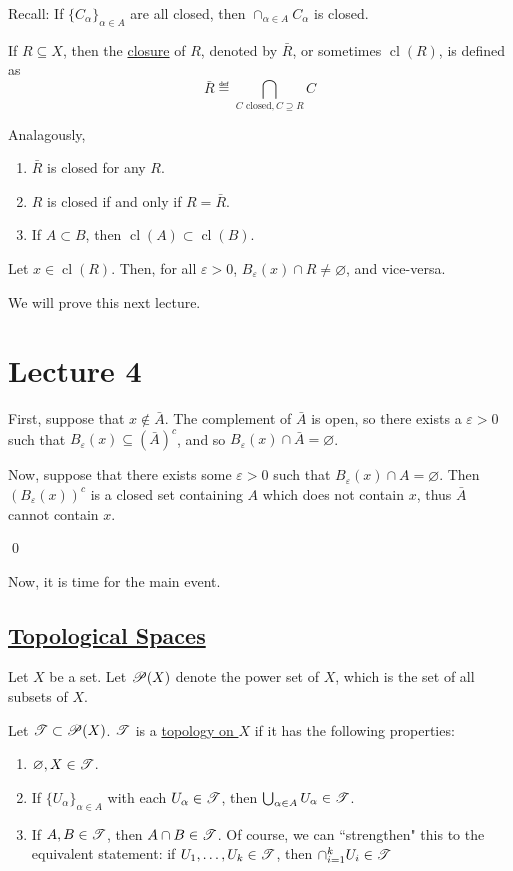 \documentclass[x11names,reqno,14pt]{extarticle}
\DeclareMathOperator{\cl}{cl}
\begin{document}
Recall: If $\{C_\alpha\}_{\alpha\in A}$ are all closed, then $\cap_{\alpha\in A}C_\alpha$ is closed. 


If $R\subseteq X$, then the \underline{closure} of $R$, denoted by $\bar{R}$, or sometimes $\cl(R)$, is defined as 
\[
\bar{R}\eqdef \bigcap_{C\text{ closed}, C\supseteq R}C
\]

Analagously, 
\begin{enumerate}
\item $\bar{R}$ is closed for any $R$. 
\item $R$ is closed if and only if $R = \bar{R}$. 
\item If $A \subset B$, then $\cl(A) \subset \cl(B)$. 
\end{enumerate}

\prop

Let $x \in \cl(R)$. Then, for all $\varepsilon>0$, $B_\varepsilon(x)\cap R \neq \varnothing$, and vice-versa. 

We will prove this next lecture. 

\section*{Lecture 4}

\proof 

First, suppose that $x\not\in \bar{A}$. The complement of $\bar{A}$ is open, so there exists a $\varepsilon>0$ such that $B_{\varepsilon}(x)\subseteq (\bar{A})^c$, and so $B_{\varepsilon}(x) \cap \bar{A} = \varnothing$. 

Now, suppose that there exists some $\varepsilon> 0$ such that $B_{\varepsilon}(x) \cap A = \varnothing$. Then $(B_{\varepsilon}(x))^c$ is a closed set containing $A$ which does not contain $x$, thus $\bar{A}$ cannot contain $x$. 

\qed

Now, it is time for the main event. 

\subsection*{\underline{Topological Spaces}}

Let $X$ be a set. Let $\mathscr{P}(X)$ denote the power set of $X$, which is the set of all subsets of $X$. 


Let $\mathscr{T} \subset\mathscr{P}(X)$. $\mathscr{T}$ is a \underline{topology on $X$} if it has the following properties: 
\begin{enumerate}
\item $\varnothing, X \in \mathscr{T}$. 
\item If $\{U_\alpha\}_{\alpha\in A}$ with each $U_\alpha \in \mathscr{T}$, then $\bigcup_{\alpha\in A}U_\alpha \in \mathscr{T}$. 
\item If $A, B \in \mathscr{T}$, then $A \cap B \in \mathscr{T}$. Of course, we can ``strengthen" this to the equivalent statement: if $U_1, \dots, U_k \in \mathscr{T}$, then $\cap_{i=1}^kU_i \in \mathscr{T}$
\end{enumerate}
\end{document}

